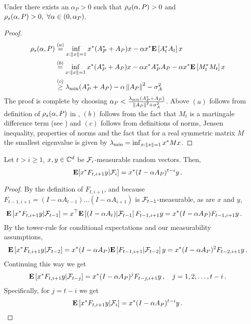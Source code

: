 \begin{lemma}\label{lm:pd}
Under  there exists an $\alpha_P>0$ such that $\rho_d(\alpha,P)>0$ and $\rho_s(\alpha,P)>0,~\forall \alpha \in (0,\alpha_P)$.
\end{lemma}
\begin{proof}
\begin{align*}
\rho_s(\alpha,P)&\stackrel{(a)}{=}\inf_{x:\left\| x\right\|=1}x^* (A_P^*+A_P)x -\alpha x^*\mathbf{E}\left[A_t^* A_t\right] x\\
&\stackrel{(b)}{=}\inf_{x:\left\| x\right\|=1}x^* (A_P^*+A_P)x -\alpha x^* A^*_P A_P -\alpha x^* \mathbf{E}\left[M_t^* M_t\right] x\\
&\stackrel{(c)}{\geq} \lambda_{\min}(A^*_P+A_P)-\alpha \left\| A_P\right\|^2-\sigma^2_A
\end{align*}
The proof is complete by choosing $\alpha_P<\frac{\lambda_{\min}(A^*_P+A_P)}{\left\| A_P\right\|^2+\sigma^2_A}$. Above $(a)$ follows from definition of $\rho_s(\alpha,P)$ in , $(b)$ follows from the fact that $M_t$ is a martingale difference term (see ) and $(c)$ follows from definitions of norms, Jensen inequality, properties of norms and the fact that for a real symmetric matrix $M$ the smallest eigenvalue is given by $\lambda_{\min}=\inf_{x:\left\| x\right\|=1} x^* M x $.
\end{proof}





\begin{lemma}\label{lem:genunroll}
Let $t>i\ge 1$, $x,y\in \mathbb{C}^d$ be $\mathcal{F}_{i}$-measurable random vectors. Then,
\begin{align*}
\mathbf{E}[x^* F_{t,i+1}y|\mathcal{F}_i]=x^* (I-\alpha A_P)^{t-i} y\,.
\end{align*}
\end{lemma}
\begin{proof}
By the definition of $F_{t,i+1}$,
and because $F_{t-1,i+1} = (I-\alpha A_{t-1}) \dots (I-\alpha A_{i+1})$ is $\mathcal{F}_{t-1}$-measurable,
as are $x$ and $y$,
\begin{align*}
\mathbf{E}\left[x^* F_{t,i+1} y | \mathcal{F}_{t-1} \right] &= x^\top \mathbf{E}\left[ (I-\alpha A_t) | \mathcal{F}_{t-1} \right] F_{t-1,i+1} y=x^*  (I-\alpha A_P)  F_{t-1,i+1} y\,.
\end{align*}
By the tower-rule for conditional expectations and our measurability assumptions,
\begin{align*}
\mathbf{E}\left[x^* F_{t,i+1} y | \mathcal{F}_{t-2} \right]=x^*  (I-\alpha A_P)  \mathbf{E}\left[F_{t-1,i+1} |\mathcal{F}_{t-2}\right] y= x^* (I-\alpha A_P)^2 F_{t-2,i+1} y\,.
\end{align*}
Continuing this way we get
\begin{align*}
\mathbf{E}\left[x^* F_{t,i+1} y | \mathcal{F}_{t-j} \right]
= x^* (I-\alpha A_P)^j F_{t-j,i+1} y\,, \quad j=1,2,\dots,t-i\,.
\end{align*}
Specifically, for $j=t-i$ we get
\begin{align*}
\mathbf{E}\left[x^* F_{t,i+1} y | \mathcal{F}_{i} \right]  = x^* (I-\alpha A_P)^{t-i} y\,.
\end{align*}
\end{proof}


